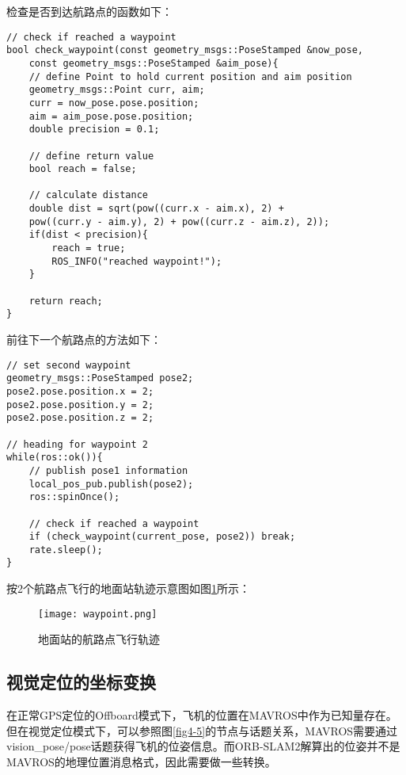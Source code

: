 检查是否到达航路点的函数如下：

\begin{verbatim}
// check if reached a waypoint
bool check_waypoint(const geometry_msgs::PoseStamped &now_pose, 
    const geometry_msgs::PoseStamped &aim_pose){
    // define Point to hold current position and aim position
    geometry_msgs::Point curr, aim;
    curr = now_pose.pose.position;
    aim = aim_pose.pose.position;
    double precision = 0.1;

    // define return value
    bool reach = false;

    // calculate distance
    double dist = sqrt(pow((curr.x - aim.x), 2) +
    pow((curr.y - aim.y), 2) + pow((curr.z - aim.z), 2));
    if(dist < precision){
        reach = true;
        ROS_INFO("reached waypoint!");
    }

    return reach;
}
\end{verbatim}

前往下一个航路点的方法如下：

\begin{verbatim}
// set second waypoint
geometry_msgs::PoseStamped pose2;
pose2.pose.position.x = 2;
pose2.pose.position.y = 2;
pose2.pose.position.z = 2;

// heading for waypoint 2
while(ros::ok()){
    // publish pose1 information
    local_pos_pub.publish(pose2);
    ros::spinOnce();

    // check if reached a waypoint
    if (check_waypoint(current_pose, pose2)) break;
    rate.sleep();
}
\end{verbatim}

按2个航路点飞行的地面站轨迹示意图如图\ref{fig4-3}所示：

\begin{figure}[!ht]
	\centering
	\texttt{[image: waypoint.png]}
	\caption{地面站的航路点飞行轨迹}
	\label{fig4-3}
\end{figure}

\subsection{视觉定位的坐标变换} \label{4.2.3}

在正常GPS定位的Offboard模式下，飞机的位置在MAVROS中作为已知量存在。但在视觉定位模式下，可以参照图\ref{fig4-5}的节点与话题关系，MAVROS需要通过vision\_pose/pose话题获得飞机的位姿信息。而ORB-SLAM2解算出的位姿并不是MAVROS的地理位置消息格式，因此需要做一些转换。

